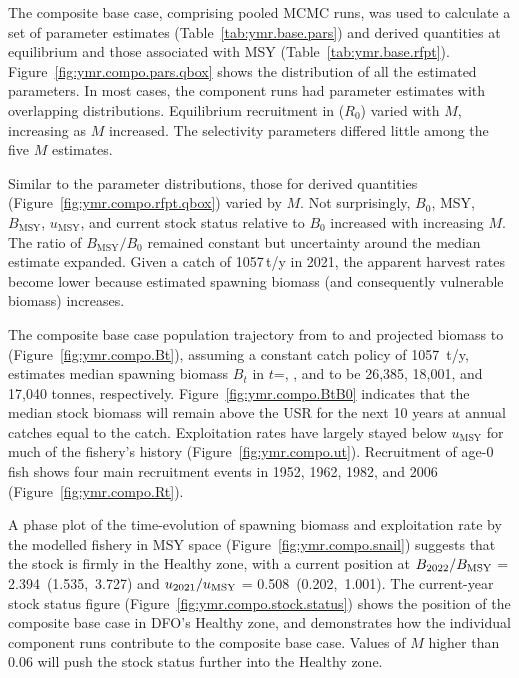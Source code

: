 \documentclass[11pt]{book}
\newcommand{\Bmsy}{B_\mathrm{MSY}}
\newcommand{\umsy}{u_\mathrm{MSY}}
\begin{document}
The composite base case, comprising  pooled MCMC runs, was used to calculate a set of parameter estimates (Table~\ref{tab:ymr.base.pars}) and derived quantities at equilibrium and those associated with MSY (Table~\ref{tab:ymr.base.rfpt}).
Figure~\ref{fig:ymr.compo.pars.qbox} shows the distribution of all the estimated parameters.
In most cases, the component runs had parameter estimates with overlapping distributions.
Equilibrium recruitment in \startYear{} ($R_0$) varied with $M$, increasing as $M$ increased.
The selectivity parameters differed little among the five $M$ estimates.

Similar to the parameter distributions, those for derived quantities (Figure~\ref{fig:ymr.compo.rfpt.qbox}) varied by $M$.
Not surprisingly, $B_0$, MSY, $\Bmsy$, $\umsy$, and current stock status relative to $B_0$ increased with increasing $M$.
The ratio of $\Bmsy/B_0$ remained constant but uncertainty around the median estimate expanded.
Given a catch of 1057\,t/y in 2021, the apparent harvest rates become lower because estimated spawning biomass (and consequently vulnerable biomass) increases.

The composite base case population trajectory from \startYear{} to \currYear{} and projected biomass to \projYear{} (Figure~\ref{fig:ymr.compo.Bt}), assuming a constant catch policy of 1057~t/y, estimates median spawning biomass $B_t$ in $t$=\startYear, \currYear, and \projYear{} to be 26,385, 18,001, and 17,040 tonnes, respectively.
Figure~\ref{fig:ymr.compo.BtB0} indicates that the median stock biomass will remain above the USR for the next 10 years at annual catches equal to the \currYear{} catch.
Exploitation rates have largely stayed below $\umsy$ for much of the fishery's history (Figure~\ref{fig:ymr.compo.ut}).
Recruitment of age-0 fish shows four main recruitment events in 1952, 1962, 1982, and 2006 (Figure~\ref{fig:ymr.compo.Rt}).

A phase plot of the time-evolution of spawning biomass and exploitation rate by the modelled fishery in MSY space (Figure~\ref{fig:ymr.compo.snail}) suggests that the stock is firmly in the Healthy zone, with a current position at $B_{\currYear}/\Bmsy$ = 2.394~(1.535,~3.727)
and $u_{\prevYear}/\umsy$ = 0.508~(0.202,~1.001).
The current-year stock status figure (Figure~\ref{fig:ymr.compo.stock.status}) shows the position of the composite base case in DFO's Healthy zone, and demonstrates how the individual component runs contribute to the composite base case.
Values of $M$ higher than 0.06 will push the stock status further into the Healthy zone.
\end{document}
